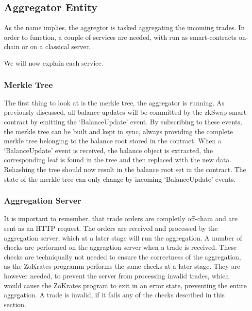 \documentclass[../../thesis.tex]{subfiles}
\begin{document}






\subsection{Aggregator Entity} \label{aggregator}
As the name implies, the aggregtor is tasked aggregating the incoming trades. In order to function, a couple of services are needed, with run as smart-contracts on-chain or on a classical server. 

We will now explain each service.

\subsubsection{Merkle Tree}
The first thing to look at is the merkle tree, the aggregator is running. As previously discussed, all balance updates will be committed by the zkSwap smart-contract by emitting the `BalanceUpdate' event. By subscribing to these events, the merkle tree can be built and kept in sync, always providing the complete merkle tree belonging to the balance root stored in the contract. When a `BalanceUpdate' event is received, the balance object is extracted, the corresponding leaf is found in the tree and then replaced with the new data. Rehashing the tree should now result in the balance root set in the contract. The state of the merkle tree can only change by incoming `BalanceUpdate' events. 

\subsubsection{Aggregation Server}
It is important to remember, that trade orders are completly off-chain and are sent as an HTTP request. The orders are received and processed by the aggregation server, which at a later stage will run the aggregation. A number of checks are performed on the aggragtion server when a trade is received. These checks are techniqually not needed to ensure the correctness of the aggregation, as the ZoKrates programm performs the same checks at a later stage. They are however needed, to prevent the server from processing invalid trades, which would cause the ZoKrates program to exit in an error state, preventing the entire aggrgation. A trade is invalid, if it fails any of the checks described in this section.
\end{document}
